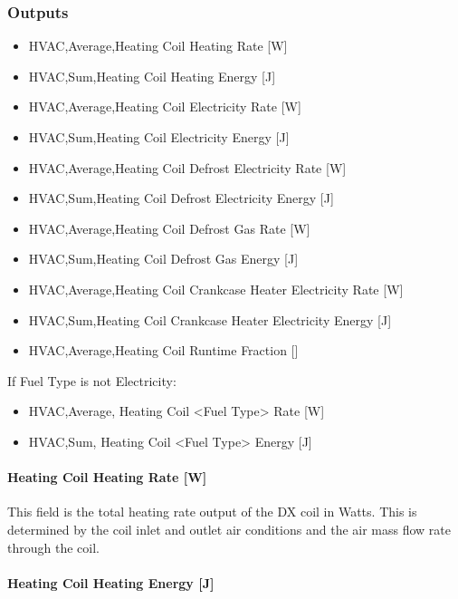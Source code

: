 \subsubsection{Outputs}\label{outputs-16}

\begin{itemize}
\item
  HVAC,Average,Heating Coil Heating Rate {[}W{]}
\item
  HVAC,Sum,Heating Coil Heating Energy {[}J{]}
\item
  HVAC,Average,Heating Coil Electricity Rate {[}W{]}
\item
  HVAC,Sum,Heating Coil Electricity Energy {[}J{]}
\item
  HVAC,Average,Heating Coil Defrost Electricity Rate {[}W{]}
\item
  HVAC,Sum,Heating Coil Defrost Electricity Energy {[}J{]}
\item
  HVAC,Average,Heating Coil Defrost Gas Rate {[}W{]}
\item
  HVAC,Sum,Heating Coil Defrost Gas Energy {[}J{]}
\item
  HVAC,Average,Heating Coil Crankcase Heater Electricity Rate {[}W{]}
\item
  HVAC,Sum,Heating Coil Crankcase Heater Electricity Energy {[}J{]}
\item
  HVAC,Average,Heating Coil Runtime Fraction {[]}
\end{itemize}

If Fuel Type is not Electricity:

\begin{itemize}
\item
  HVAC,Average, Heating Coil \textless{}Fuel Type\textgreater{} Rate {[}W{]}
\item
  HVAC,Sum, Heating Coil \textless{}Fuel Type\textgreater{} Energy {[}J{]}
\end{itemize}

\paragraph{Heating Coil Heating Rate {[}W{]}}\label{heating-coil-heating-rate-w-8}

This field is the total heating rate output of the DX coil in Watts. This is determined by the coil inlet and outlet air conditions and the air mass flow rate through the coil.

\paragraph{Heating Coil Heating Energy {[}J{]}}\label{heating-coil-heating-energy-j-8}

